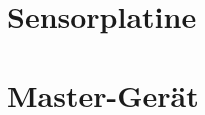 \clearpage
\section{Sensorplatine}
\label{sec:validierung:sensorplatine}


\section{Master-Ger\"at}
\label{sec:validierung:master}
